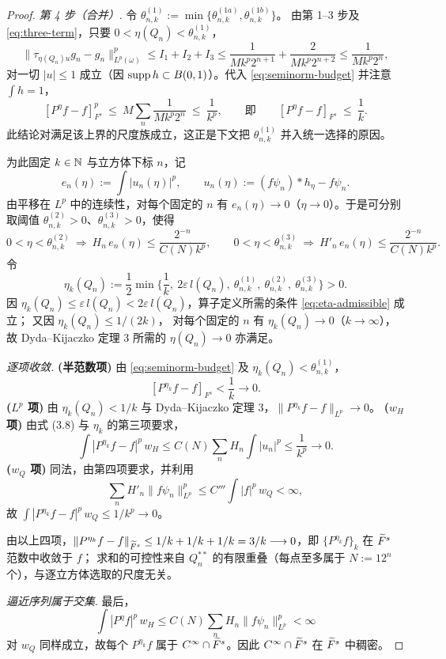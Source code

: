 \begin{proof}
\emph{第 4 步（合并）}. 令 $\theta^{(1)}_{n,k}:=\min\{\theta^{(1a)}_{n,k},\theta^{(1b)}_{n,k}\}$。
由第 1--3 步及 \eqref{eq:three-term}，只要 $0<\eta(Q_n)<\theta^{(1)}_{n,k}$，
\[
  \big\|\tau_{\eta(Q_n)u}g_n-g_n\big\|^p_{L^p(\omega)}
  \le I_1+I_2+I_3
  \le \frac{1}{Mk^{p}2^{n+1}}+\frac{2}{Mk^{p}2^{n+2}}
  \le \frac{1}{Mk^{p}2^{n}} ,
\]
对一切 $|u|\le1$ 成立（因 $\operatorname{supp} h\subset B(0,1)$）。代入 \eqref{eq:seminorm-budget} 并注意 $\int h=1$，
\[
  [P^{\eta}f-f]_{F^s}^{p}
  \ \le\ M\sum_{n}\frac{1}{Mk^{p}2^{n}}\ \le\ \frac{1}{k^{p}},
  \qquad\text{即}\qquad
  [P^{\eta}f-f]_{F^s}\ \le\ \frac1k .
\]
此结论对满足该上界的尺度族成立，这正是下文把 $\theta^{(1)}_{n,k}$ 并入统一选择的原因。

为此固定 $k\in\mathbb{N}$ 与立方体下标 $n$，记
\[
  e_n(\eta):=\int|u_n(\eta)|^p,\qquad u_n(\eta):=(f\psi_n)*h_\eta-f\psi_n .
\]
由平移在 $L^p$ 中的连续性，对每个固定的 $n$ 有 $e_n(\eta)\to0$（$\eta\to0$）。于是可分别取阈值
$\theta^{(2)}_{n,k}>0$、$\theta^{(3)}_{n,k}>0$，使得
\[
  0<\eta<\theta^{(2)}_{n,k}\ \Longrightarrow\ H_n\,e_n(\eta)\le\frac{2^{-n}}{C(N)k^{p}},
  \qquad
  0<\eta<\theta^{(3)}_{n,k}\ \Longrightarrow\ H'_n\,e_n(\eta)\le\frac{2^{-n}}{C(N)k^{p}}.
\]
令
\[
  \eta_k(Q_n):=\frac12\min\Big\{\frac1k,\ 2\varepsilon\,l(Q_n),\ \theta^{(1)}_{n,k},\ \theta^{(2)}_{n,k},\ \theta^{(3)}_{n,k}\Big\}>0 .
\]
因 $\eta_k(Q_n)\le\varepsilon\,l(Q_n)<2\varepsilon\,l(Q_n)$，算子定义所需的条件 \eqref{eq:eta-admissible} 成立；
又因 $\eta_k(Q_n)\le 1/(2k)$，
对每个固定的 $n$ 有 $\eta_k(Q_n)\to0$（$k\to\infty$），故 Dyda--Kijaczko 定理 3 所需的
$\eta(Q_n)\to0$ 亦满足。

\emph{逐项收敛.}
\textbf{(半范数项)} 由 \eqref{eq:seminorm-budget} 及 $\eta_k(Q_n)<\theta^{(1)}_{n,k}$，
\[
  [P^{\eta_k}f-f]_{F^s}<\frac1k\longrightarrow0 .
\]
\textbf{($L^p$ 项)} 由 $\eta_k(Q_n)<1/k$ 与 Dyda--Kijaczko 定理 3，$\|P^{\eta_k}f-f\|_{L^p}\to0$。
\textbf{($w_H$ 项)} 由式 (3.8) 与 $\eta_k$ 的第三项要求，
\[
  \int|P^{\eta_k}f-f|^p\,w_H\le C(N)\sum_n H_n\int|u_n|^p\le\frac{1}{k^{p}}\longrightarrow0 .
\]
\textbf{($w_Q$ 项)} 同法，由第四项要求，并利用
\[
  \sum_n H'_n\|f\psi_n\|^p_{L^p}\le C'''\int|f|^p\,w_Q<\infty ,
\]
故 $\int|P^{\eta_k}f-f|^p\,w_Q\le 1/k^{p}\longrightarrow0$。

由以上四项，$\|P^{\eta_k}f-f\|_{\widetilde F^s}\le 1/k+1/k+1/k=3/k\longrightarrow0$，即 $\{P^{\eta_k}f\}_{k}$ 在 $\widetilde F^s$ 范数中收敛于 $f$；
求和的可控性来自 $Q_n^{**}$ 的有限重叠（每点至多属于 $N:=12^{n}$ 个），与逐立方体选取的尺度无关。

\emph{逼近序列属于交集}. 最后，
\[
  \int|P^\eta f|^p\,w_H\le C(N)\sum_n H_n\|f\psi_n\|^p_{L^p}<\infty
\]
对 $w_Q$ 同样成立，故每个 $P^{\eta_k}f$ 属于 $C^\infty\cap\widetilde F^s$。因此 $C^\infty\cap\widetilde F^s$ 在 $\widetilde F^s$ 中稠密。
\end{proof}

